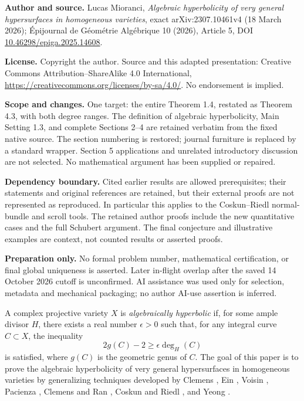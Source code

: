 \documentclass[10pt,a4paper]{article}
\numberwithin{equation}{section}
\theoremstyle{definition}
\theoremstyle{remark}
\begin{document}
\noindent\textbf{Author and source.} Lucas Mioranci, \emph{Algebraic hyperbolicity of very general hypersurfaces in homogeneous varieties}, exact arXiv:2307.10461v4 (18 March 2026); \'Epijournal de G\'eom\'etrie Alg\'ebrique 10 (2026), Article 5, DOI \href{https://doi.org/10.46298/epiga.2025.14608}{10.46298/epiga.2025.14608}.
\par\noindent\textbf{License.} Copyright the author. Source and this adapted presentation: Creative Commons Attribution--ShareAlike 4.0 International, \url{https://creativecommons.org/licenses/by-sa/4.0/}. No endorsement is implied.
\par\noindent\textbf{Scope and changes.} One target: the entire Theorem 1.4, restated as Theorem 4.3, with both degree ranges. The definition of algebraic hyperbolicity, Main Setting 1.3, and complete Sections 2--4 are retained verbatim from the fixed native source. The section numbering is restored; journal furniture is replaced by a standard wrapper. Section 5 applications and unrelated introductory discussion are not selected. No mathematical argument has been supplied or repaired.
\par\noindent\textbf{Dependency boundary.} Cited earlier results are allowed prerequisites; their statements and original references are retained, but their external proofs are not represented as reproduced. In particular this applies to the Coskun--Riedl normal-bundle and scroll tools. The retained author proofs include the new quantitative cases and the full Schubert argument. The final conjecture and illustrative examples are context, not counted results or asserted proofs.
\par\noindent\textbf{Preparation only.} No formal problem number, mathematical certification, or final global uniqueness is asserted. Later in-flight overlap after the saved 14 October 2026 cutoff is unconfirmed. AI assistance was used only for selection, metadata and mechanical packaging; no author AI-use assertion is inferred.

A complex projective variety $X$ is \textit{algebraically hyperbolic} if, for some ample divisor $H$, there exists a real number $\epsilon > 0$ such that, for any integral curve $C\subset X$, the inequality
\[ 2g(C)-2\ge \epsilon \deg_H(C) \]
is satisfied, where $g(C)$ is the geometric genus of $C$. The goal of this paper is to prove the algebraic hyperbolicity of very general hypersurfaces in homogeneous varieties by generalizing techniques developed by Clemens \cite{Cl86, Cl03}, Ein \cite{Ei88, Ei91}, Voisin \cite{Vo96,Vo98}, Pacienza \cite{Pa03,Pa04}, Clemens and Ran \cite{ClR04}, Coskun and Riedl \cite{CR19a,CR19}, and Yeong \cite{Y22}.
\end{document}
